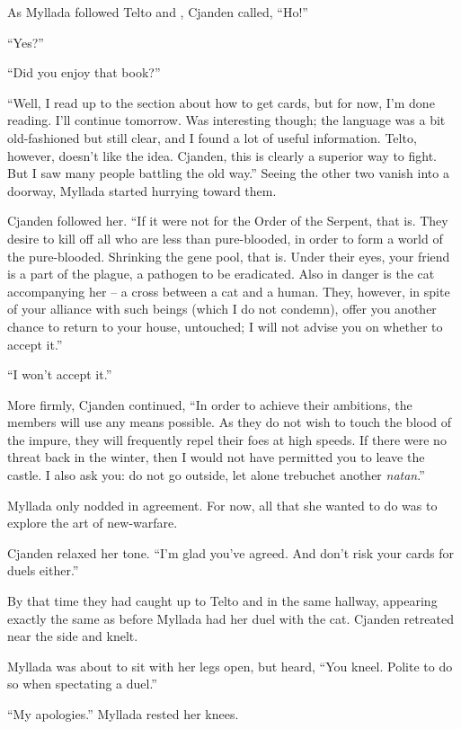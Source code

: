 As Myllada followed Telto and \yronsyncra, Cjanden called, ``Ho!''

``Yes?''

``Did you enjoy that book?''

``Well, I read up to the section about how to get cards, but for now, I'm done reading. I'll continue tomorrow. Was interesting though; the language was a bit old-fashioned but still clear, and I found a lot of useful information. Telto, however, doesn't like the idea. Cjanden, this is clearly a superior way to fight. But I saw many people battling the old way.'' Seeing the other two vanish into a doorway, Myllada started hurrying toward them.

Cjanden followed her. ``If it were not for the Order of the Serpent, that is. They desire to kill off all who are less than pure-blooded, in order to form a world of the pure-blooded. Shrinking the gene pool, that is. Under their eyes, your friend is a part of the plague, a pathogen to be eradicated. Also in danger is the cat accompanying her -- a cross between a cat and a human. They, however, in spite of your alliance with such beings (which I do not condemn), offer you another chance to return to your house, untouched; I will not advise you on whether to accept it.''

``I won't accept it.''

More firmly, Cjanden continued, ``In order to achieve their ambitions, the members will use any means possible. As they do not wish to touch the blood of the impure, they will frequently repel their foes at high speeds. If there were no threat back in the winter, then I would not have permitted you to leave the castle. I also ask you: do not go outside, let alone trebuchet another \emph{natan}.''

Myllada only nodded in agreement. For now, all that she wanted to do was to explore the art of new-warfare.

Cjanden relaxed her tone. ``I'm glad you've agreed. And don't risk your cards for duels either.''

By that time they had caught up to Telto and \yronsyncra{} in the same hallway, appearing exactly the same as before Myllada had her duel with the cat. Cjanden retreated near the side and knelt.

Myllada was about to sit with her legs open, but heard, ``You kneel. Polite to do so when spectating a duel.''

``My apologies.'' Myllada rested her knees.

